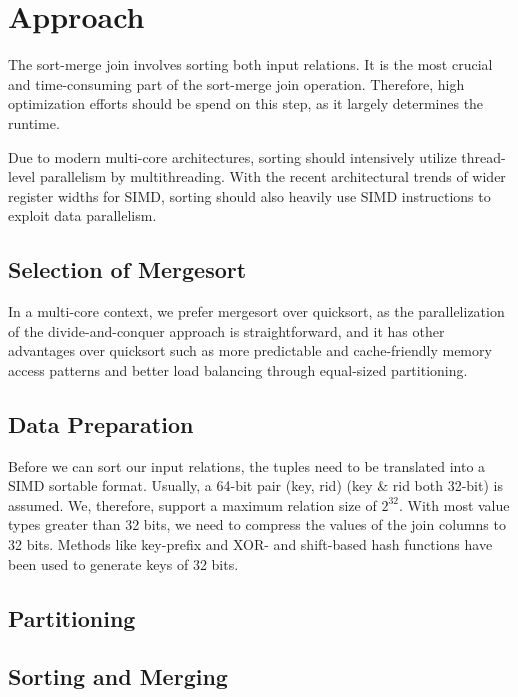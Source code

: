 \section{Approach}
\label{sec:approach}


The sort-merge join involves sorting both input relations. It is the most crucial and 
time-consuming part of the sort-merge join operation. Therefore, high optimization efforts should
be spend on this step, as it largely determines the runtime. 

Due to modern multi-core 
architectures, sorting should intensively utilize thread-level parallelism by multithreading.
With the recent architectural trends of wider register widths for SIMD, sorting should also
heavily use SIMD instructions to exploit data parallelism. 

\subsection{Selection of Mergesort}
In a multi-core context, we prefer mergesort over quicksort, as the parallelization of the divide-and-conquer approach
is straightforward, and it has other advantages over quicksort such as more predictable and 
cache-friendly memory access patterns and better load balancing through equal-sized partitioning. 

\subsection{Data Preparation}
Before we can sort our input relations, the tuples need to be translated into a SIMD sortable
format. Usually, a 64-bit pair (key, rid) (key \& rid both 32-bit) is assumed. We, therefore,
support a maximum relation size of $2^{32}$. With most value types greater
than 32 bits, we need to compress the values of the join columns to 32 bits. Methods like 
key-prefix \cite{chris_nyberg__1994} and XOR- and shift-based hash functions \cite{1319989} have 
been used to generate keys of 32 bits.

\subsection{Partitioning}

\subsection{Sorting and Merging}

